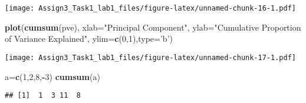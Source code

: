 \documentclass[]{article}
\newenvironment{Shaded}{\begin{snugshade}}{\end{snugshade}}
\newcommand{\DataTypeTok}[1]{\textcolor[rgb]{0.13,0.29,0.53}{#1}}
\newcommand{\DecValTok}[1]{\textcolor[rgb]{0.00,0.00,0.81}{#1}}
\newcommand{\KeywordTok}[1]{\textcolor[rgb]{0.13,0.29,0.53}{\textbf{#1}}}
\newcommand{\NormalTok}[1]{#1}
\newcommand{\OperatorTok}[1]{\textcolor[rgb]{0.81,0.36,0.00}{\textbf{#1}}}
\newcommand{\StringTok}[1]{\textcolor[rgb]{0.31,0.60,0.02}{#1}}
\begin{document}
\texttt{[image: Assign3\_Task1\_lab1\_files/figure-latex/unnamed-chunk-16-1.pdf]}

\begin{Shaded}
\begin{Highlighting}[]
\KeywordTok{plot}\NormalTok{(}\KeywordTok{cumsum}\NormalTok{(pve), }\DataTypeTok{xlab=}\StringTok{"Principal Component"}\NormalTok{, }\DataTypeTok{ylab=}\StringTok{"Cumulative Proportion of Variance Explained"}\NormalTok{, }\DataTypeTok{ylim=}\KeywordTok{c}\NormalTok{(}\DecValTok{0}\NormalTok{,}\DecValTok{1}\NormalTok{),}\DataTypeTok{type=}\StringTok{'b'}\NormalTok{)}
\end{Highlighting}
\end{Shaded}

\texttt{[image: Assign3\_Task1\_lab1\_files/figure-latex/unnamed-chunk-17-1.pdf]}

\begin{Shaded}
\begin{Highlighting}[]
\NormalTok{a=}\KeywordTok{c}\NormalTok{(}\DecValTok{1}\NormalTok{,}\DecValTok{2}\NormalTok{,}\DecValTok{8}\NormalTok{,}\OperatorTok{-}\DecValTok{3}\NormalTok{)}
\KeywordTok{cumsum}\NormalTok{(a)}
\end{Highlighting}
\end{Shaded}

\begin{verbatim}
## [1]  1  3 11  8
\end{verbatim}
\end{document}

